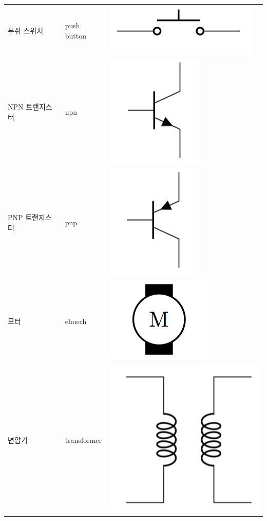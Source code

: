 \documentclass[12pt]{book}
\begin{document}
\begin{table}[]
\begin{tabular}{lll}
			푸쉬 스위치     & push button             & \includegraphics[height=0.045\linewidth]{./images/circuitikz_19.png}       \\
			NPN 트랜지스터  & npn                     &\includegraphics[height=0.045\linewidth]{./images/circuitikz_20.png}        \\
			PNP 트랜지스터  & pnp                     & \includegraphics[height=0.045\linewidth]{./images/circuitikz_21.png}       \\
			모터         & elmech                  &  \includegraphics[height=0.045\linewidth]{./images/circuitikz_22.png}      \\
			변압기        & transformer             &   \includegraphics[height=0.045\linewidth]{./images/circuitikz_23.png}    
		\end{tabular}
	\end{table}
	
\end{document}
